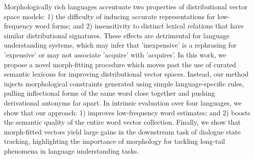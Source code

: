 Morphologically rich languages accentuate two properties of distributional vector space models: 1) the difficulty of inducing accurate representations for low-frequency word forms; and 2) insensitivity to distinct lexical relations that have similar distributional signatures. These effects are detrimental for language understanding systems, which may infer that  'inexpensive' is a rephrasing for 'expensive' or may not associate 'acquire' with 'acquires'. In this work, we propose a novel morph-fitting procedure which moves past the use of curated semantic lexicons for improving distributional vector spaces. Instead, our method injects morphological constraints generated using simple language-specific rules, pulling inflectional forms of the same word close together and pushing derivational antonyms far apart. In intrinsic evaluation over four languages, we show that our approach: 1) improves low-frequency word estimates; and 2) boosts the semantic quality of the entire word vector collection. Finally, we show that morph-fitted vectors yield large gains in the downstream task of dialogue state tracking, highlighting the importance of morphology for tackling long-tail phenomena in language understanding tasks.

